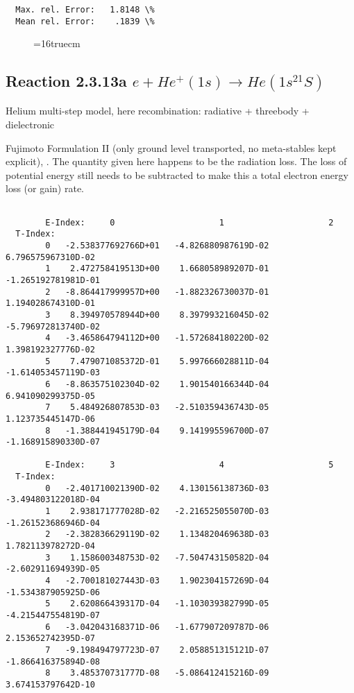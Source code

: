 \documentclass[12pt,dvipdfmx]{article}
\begin{document}
{\begin{small}
\begin{verbatim}
  Max. rel. Error:   1.8148 \%
  Mean rel. Error:    .1839 \%

\end{verbatim}\end{small}
\begin{figure} \label{2.3.9aer}
\epsfxsize=16truecm
\end{figure}
\newpage


\subsection{
Reaction 2.3.13a $e+ He^+(1s) \rightarrow   He(1s^21S)$
}
Helium multi-step model, here recombination:  radiative + threebody + dielectronic

 Fujimoto Formulation II (only ground level transported, no meta-stables
 kept explicit), \cite{kn:Fujimoto}.
 The quantity given here happens to be the radiation loss.
 The loss of potential energy still needs to be subtracted to make
 this a total electron energy loss (or gain) rate.



\begin{small}\begin{verbatim}

        E-Index:     0                     1                     2
  T-Index:
        0   -2.538377692766D+01   -4.826880987619D-02    6.796575967310D-02
        1    2.472758419513D+00    1.668058989207D-01   -1.265192781981D-01
        2   -8.864417999957D+00   -1.882326730037D-01    1.194028674310D-01
        3    8.394970578944D+00    8.397993216045D-02   -5.796972813740D-02
        4   -3.465864794112D+00   -1.572684180220D-02    1.398192327776D-02
        5    7.479071085372D-01    5.997666028811D-04   -1.614053457119D-03
        6   -8.863575102304D-02    1.901540166344D-04    6.941090299375D-05
        7    5.484926807853D-03   -2.510359436743D-05    1.123735445147D-06
        8   -1.388441945179D-04    9.141995596700D-07   -1.168915890330D-07

        E-Index:     3                     4                     5
  T-Index:
        0   -2.401710021390D-02    4.130156138736D-03   -3.494803122018D-04
        1    2.938171777028D-02   -2.216525055070D-03   -1.261523686946D-04
        2   -2.382836629119D-02    1.134820469638D-03    1.782113978272D-04
        3    1.158600348753D-02   -7.504743150582D-04   -2.602911694939D-05
        4   -2.700181027443D-03    1.902304157269D-04   -1.534387905925D-06
        5    2.620866439317D-04   -1.103039382799D-05   -4.215447554819D-07
        6   -3.042043168371D-06   -1.677907209787D-06    2.153652742395D-07
        7   -9.198494797723D-07    2.058851315121D-07   -1.866416375894D-08
        8    3.485370731777D-08   -5.086412415216D-09    3.674153797642D-10


\end{verbatim}
\end{small}}
\end{document}
